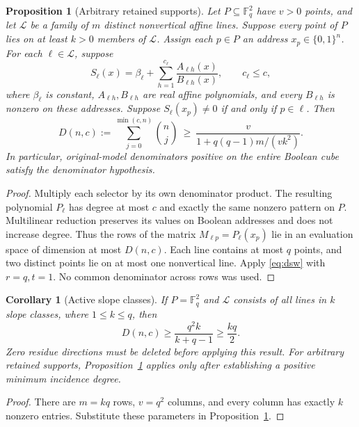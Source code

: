 \documentclass[11pt]{article}
\newtheorem{proposition}{Proposition}
\newtheorem{corollary}{Corollary}
\newcommand{\FF}{\mathbb F}
\begin{document}
\begin{proposition}[Arbitrary retained supports]\label{prop:arbitrary}
Let $P\subseteq\FF_q^2$ have $v>0$ points, and let $\mathcal L$ be a family of
$m$ distinct nonvertical affine lines. Suppose every point of $P$ lies on at
least $k>0$ members of $\mathcal L$. Assign each $p\in P$ an address
$x_p\in\{0,1\}^n$. For each $\ell\in\mathcal L$, suppose
\[
 S_\ell(x)=\beta_\ell+\sum_{h=1}^{c_\ell}
 \frac{A_{\ell h}(x)}{B_{\ell h}(x)},\qquad c_\ell\leq c,
\]
where $\beta_\ell$ is constant, $A_{\ell h},B_{\ell h}$ are real affine
polynomials, and every $B_{\ell h}$ is nonzero on these addresses. Suppose
$S_\ell(x_p)\neq0$ if and only if $p\in\ell$. Then
\[
 D(n,c):=\sum_{j=0}^{\min(c,n)}\binom nj
 \ \geq\ \frac{v}{1+q(q-1)m/(vk^2)}.
\]
In particular, original-model denominators positive on the entire Boolean
cube satisfy the denominator hypothesis.
\end{proposition}
\begin{proof}
Multiply each selector by its own denominator product. The resulting
polynomial $P_\ell$ has degree at most $c$ and exactly the same nonzero
pattern on $P$. Multilinear reduction preserves its values on Boolean
addresses and does not increase degree. Thus the rows of the matrix
$M_{\ell p}=P_\ell(x_p)$ lie in an evaluation space of dimension at most
$D(n,c)$. Each line contains at most $q$ points, and two distinct points
lie on at most one nonvertical line. Apply \eqref{eq:dsw} with $r=q,t=1$.
No common denominator across rows was used.
\end{proof}

\begin{corollary}[Active slope classes]\label{cor:active}
If $P=\FF_q^2$ and $\mathcal L$ consists of all lines in $k$ slope classes,
where $1\leq k\leq q$, then
\[
 D(n,c)\geq\frac{q^2k}{k+q-1}\geq\frac{kq}{2}.
\]
Zero residue directions must be deleted before applying this result.
For arbitrary retained supports, Proposition~\ref{prop:arbitrary} applies
only after establishing a positive minimum incidence degree.
\end{corollary}
\begin{proof}
There are $m=kq$ rows, $v=q^2$ columns, and every column has exactly $k$
nonzero entries. Substitute these parameters in Proposition~\ref{prop:arbitrary}.
\end{proof}
\end{document}
